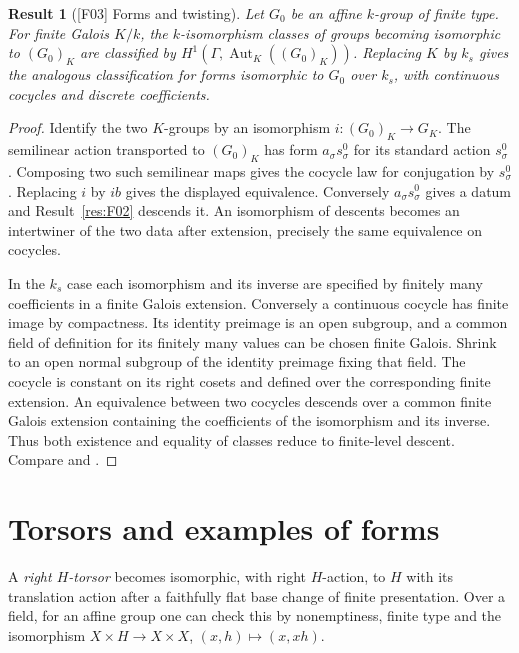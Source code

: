 \documentclass[11pt,a4paper,openany,oneside]{book}
\theoremstyle{resultstyle}
\newtheorem{statement}{Result}[chapter]
\newenvironment{result}[2]{\clubpenalty=10000\begin{statement}[\textnormal{[#1]} #2]\leavevmode\label{res:#1}\ignorespaces}{\end{statement}}
\theoremstyle{definition}
\numberwithin{equation}{chapter}
\DeclareMathOperator{\Aut}{Aut}
\begin{document}
\begin{result}{F03}{Forms and twisting}
Let $G_0$ be an affine $k$-group of finite type. For finite Galois $K/k$, the $k$-isomorphism classes of groups becoming isomorphic to $(G_0)_K$ are classified by
$H^1(\Gamma,\Aut_K((G_0)_K))$. Replacing $K$ by $k_s$ gives the analogous classification for forms isomorphic to $G_0$ over $k_s$, with continuous cocycles and discrete coefficients.
\end{result}
\begin{proof}
Identify the two $K$-groups by an isomorphism $i\colon (G_0)_K\to G_K$. The semilinear action transported to $(G_0)_K$ has form $a_\sigma s_\sigma^0$ for its standard action $s_\sigma^0$. Composing two such semilinear maps gives the cocycle law for conjugation by $s_\sigma^0$. Replacing $i$ by $ib$ gives the displayed equivalence. Conversely $a_\sigma s_\sigma^0$ gives a datum and Result~\ref{res:F02} descends it. An isomorphism of descents becomes an intertwiner of the two data after extension, precisely the same equivalence on cocycles.

In the $k_s$ case each isomorphism and its inverse are specified by finitely many coefficients in a finite Galois extension. Conversely a continuous cocycle has finite image by compactness. Its identity preimage is an open subgroup, and a common field of definition for its finitely many values can be chosen finite Galois. Shrink to an open normal subgroup of the identity preimage fixing that field. The cocycle is constant on its right cosets and defined over the corresponding finite extension. An equivalence between two cocycles descends over a common finite Galois extension containing the coefficients of the isomorphism and its inverse. Thus both existence and equality of classes reduce to finite-level descent. Compare \cite[Secs.~2.3.2--2.3.3 and Lemma 2.3.9]{gs} and \cite[Secs.~3.43, 3.49]{milne}.
\end{proof}

\section{Torsors and examples of forms}

A \emph{right $H$-torsor} becomes isomorphic, with right $H$-action, to $H$ with its translation action after a faithfully flat base change of finite presentation. Over a field, for an affine group one can check this by nonemptiness, finite type and the isomorphism $X\times H\to X\times X$, $(x,h)\mapsto(x,xh)$.
\end{document}

